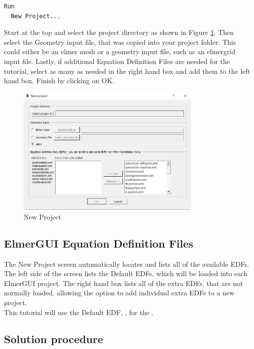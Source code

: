 \begin{verbatim}
Run
  New Project...
\end{verbatim}

Start at the top and select the project directory as shown in Figure \ref{fg:new_project}.  Then select the Geometry input file, that was copied into your project folder.  This could either be an elmer mesh or a geometry input file, such as an elmergrid input file.  Lastly, if additional Equation Definition Files are needed for the tutorial, select as many as needed in the right hand box and add them to the left hand box.  Finish by clicking on OK.

\begin{figure}[H]
\centering
\includegraphics[width=0.8\textwidth]{new_project.png}
\caption{New Project}\label{fg:new_project}
\end{figure}  

\subsection*{ElmerGUI Equation Definition Files}

The New Project screen automatically locates and lists all of the available EDFs.  The left side of the screen lists the Default EDFs, which will be loaded into each ElmerGUI project.  The right hand box lists all of the extra EDFs, that are not normally loaded, allowing the option to add individual extra EDFs to a new project.\\

This tutorial will use the Default EDF, \texttt{}, for the .

\subsection*{Solution procedure}

